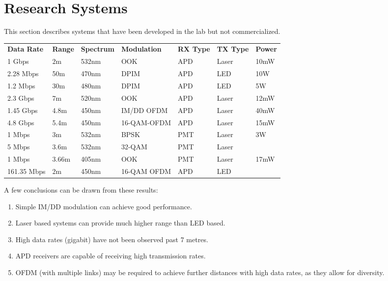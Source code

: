 \section{Research Systems}
This section describes systems that have been developed in the lab but not
commercialized.

\begin{table}[H]
\begin{tabular}{lllllll}
\textbf{Data Rate} & \textbf{Range} & \textbf{Spectrum} & \textbf{Modulation} &
\textbf{RX Type} & \textbf{TX Type} & \textbf{Power} \\
1 Gbps      & 2m     & 532nm & OOK         & APD & Laser & 10mW           \\
2.28 Mbps   & 50m    & 470nm & DPIM        & APD & LED   & 10W            \\
1.2 Mbps    & 30m    & 480nm & DPIM        & APD & LED   & 5W             \\
2.3 Gbps    & 7m     & 520nm & OOK         & APD & Laser & 12mW           \\
1.45 Gbps   & 4.8m   & 450nm & IM/DD OFDM  & APD & Laser & 40mW           \\
4.8 Gbps    & 5.4m   & 450nm & 16-QAM-OFDM & APD & Laser & 15mW           \\
1 Mbps      & 3m     & 532nm & BPSK        & PMT & Laser & 3W             \\
5 Mbps      & 3.6m   & 532nm & 32-QAM      & PMT & Laser &                \\
1 Mbps      & 3.66m  & 405nm & OOK         & PMT & Laser & 17mW           \\
161.35 Mbps & 2m     & 450nm & 16-QAM OFDM & APD & LED  &
\end{tabular}
\end{table}

A few conclusions can be drawn from these results:
\begin{enumerate}
\item Simple IM/DD modulation can achieve good performance.
\item Laser based systems can provide much higher range than \ac{LED} based.
\item High data rates (gigabit) have not been observed past 7 metres.
\item \ac{APD} receivers are capable of receiving high transmission rates.
\item \ac{OFDM} (with multiple links) may be required to achieve further
distances with high data rates, as they allow for diversity.
\end{enumerate}
